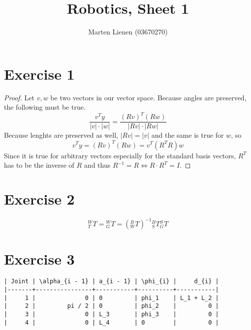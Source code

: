\documentclass[10pt,a4paper]{article}
\title{Robotics, Sheet 1}
\author{Marten Lienen (03670270)}
\begin{document}
\maketitle

\section*{Exercise 1}

\begin{proof}
  Let $v, w$
  be two vectors in our vector space. Because angles are preserved, the
  following must be true.
  \begin{equation*}
    \frac{v^{T}y}{|v| \cdot |w|} = \frac{(Rv)^{T}(Rw)}{|Rv| \cdot |Rw|}
  \end{equation*}
  Because lenghts are preserved as well, $|Rv| = |v|$
  and the same is true for $w$, so
  \begin{equation*}
    v^{T}y = (Rv)^{T}(Rw) = v^{T}(R^{T}R)w
  \end{equation*}
  Since it is true for arbitrary vectors especially for the standard basis
  vectors, $R^{T}$
  has to be the inverse of $R$
  and thus $R^{-1} = R \Leftrightarrow R \cdot R^{T} = I$.
\end{proof}

\section*{Exercise 2}

\begin{equation*}
  {}_{T}^{W}T = {}_{G}^{W}T = ({}_{W}^{B}T)^{-1}{}_{S}^{B}T{}_{G}^{S}T
\end{equation*}

\section*{Exercise 3}

\begin{verbatim}
| Joint | \alpha_{i - 1} | a_{i - 1} | \phi_{i} |     d_{i} |
|-------+----------------+-----------+----------+-----------|
|     1 |              0 | 0         | phi_1    | L_1 + L_2 |
|     2 |         pi / 2 | 0         | phi_2    |         0 |
|     3 |              0 | L_3       | phi_3    |         0 |
|     4 |              0 | L_4       | 0        |         0 |
\end{verbatim}
\end{document}
